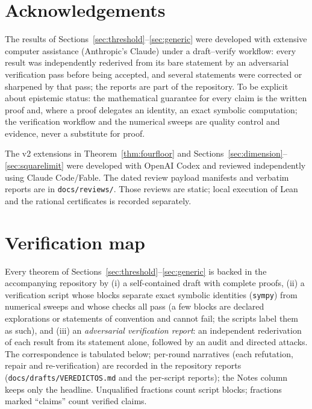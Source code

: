\documentclass[11pt]{article}
\theoremstyle{definition}
\begin{document}
\section*{Acknowledgements}
The results of Sections~\ref{sec:threshold}--\ref{sec:generic} were developed
with extensive computer assistance (Anthropic's Claude) under a
draft--verify workflow: every result was independently rederived from its
bare statement by an adversarial verification pass before being accepted,
and several statements were corrected or sharpened by that pass; the reports
are part of the repository. To be explicit about epistemic status: the
mathematical guarantee for every claim is the written proof and, where a
proof delegates an identity, an exact symbolic computation; the verification
workflow and the numerical sweeps are quality control and evidence, never a
substitute for proof.

The v2 extensions in Theorem~\ref{thm:fourfloor} and
Sections~\ref{sec:dimension}--\ref{sec:squarelimit} were developed with
OpenAI Codex and reviewed independently using Claude Code/Fable.
The dated review payload manifests and verbatim reports are in
\texttt{docs/reviews/}. Those reviews are static; local execution of
Lean and the rational certificates is recorded separately.

\appendix
\section{Verification map}\label{app:verifmap}

Every theorem of Sections~\ref{sec:threshold}--\ref{sec:generic} is backed in
the accompanying repository by (i) a self-contained draft with complete
proofs, (ii) a verification script whose blocks separate exact symbolic
identities (\texttt{sympy}) from numerical sweeps and whose checks all pass (a few blocks
are declared explorations or statements of convention and cannot fail;
the scripts label them as such), and (iii) an
\emph{adversarial verification report}: an independent rederivation of each
result from its statement alone, followed by an audit and directed attacks.
The correspondence is tabulated below; per-round narratives (each
refutation, repair and re-verification) are recorded in the
repository reports (\texttt{docs/drafts/VEREDICTOS.md} and the
per-script reports); the Notes column keeps only the
headline. Unqualified fractions count script blocks; fractions
marked ``claims'' count verified claims.
\end{document}
